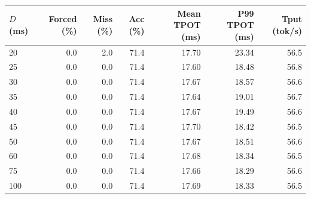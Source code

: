 \begin{tabular}{lrrrrrr}
\toprule
$D$ (ms) & Forced (\%) & Miss (\%) & Acc (\%) & Mean TPOT (ms) & P99 TPOT (ms) & Tput (tok/s) \\
\midrule
  20 & 0.0 & 2.0 & 71.4 & 17.70 & 23.34 & 56.5 \\
  25 & 0.0 & 0.0 & 71.4 & 17.60 & 18.48 & 56.8 \\
  30 & 0.0 & 0.0 & 71.4 & 17.67 & 18.57 & 56.6 \\
  35 & 0.0 & 0.0 & 71.4 & 17.64 & 19.01 & 56.7 \\
  40 & 0.0 & 0.0 & 71.4 & 17.67 & 19.49 & 56.6 \\
  45 & 0.0 & 0.0 & 71.4 & 17.70 & 18.42 & 56.5 \\
  50 & 0.0 & 0.0 & 71.4 & 17.67 & 18.51 & 56.6 \\
  60 & 0.0 & 0.0 & 71.4 & 17.68 & 18.34 & 56.5 \\
  75 & 0.0 & 0.0 & 71.4 & 17.66 & 18.29 & 56.6 \\
  100 & 0.0 & 0.0 & 71.4 & 17.69 & 18.33 & 56.5 \\
\bottomrule
\end{tabular}
